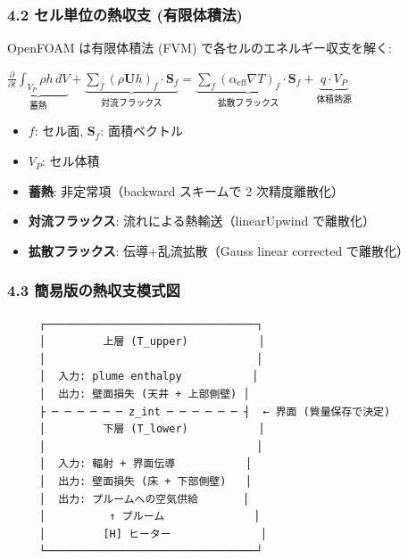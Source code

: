 \documentclass[a4paper,11pt]{article}
\begin{document}
\subsubsection{4.2 セル単位の熱収支 (有限体積法)}

OpenFOAM は有限体積法 (FVM) で各セルのエネルギー収支を解く:

$
\underbrace{\frac{\partial}{\partial t} \int_{V_P} \rho h \, dV}_{\text{蓄熱}}
+ \underbrace{\sum_f (\rho \mathbf{U} h)_f \cdot \mathbf{S}_f}_{\text{対流フラックス}}
= \underbrace{\sum_f (\alpha_{\text{eff}} \nabla T)_f \cdot \mathbf{S}_f}_{\text{拡散フラックス}}
+ \underbrace{q \cdot V_P}_{\text{体積熱源}}
$

\begin{itemize} \item $f$: セル面, $\mathbf{S}_f$: 面積ベクトル \end{itemize}
\begin{itemize} \item $V_P$: セル体積 \end{itemize}
\begin{itemize} \item \textbf{蓄熱}: 非定常項（backward スキームで 2 次精度離散化） \end{itemize}
\begin{itemize} \item \textbf{対流フラックス}: 流れによる熱輸送（linearUpwind で離散化） \end{itemize}
\begin{itemize} \item \textbf{拡散フラックス}: 伝導+乱流拡散（Gauss linear corrected で離散化） \end{itemize}

\subsubsection{4.3 簡易版の熱収支模式図}

\begin{verbatim}
     ┌─────────────────────────────────┐
     │         上層 (T_upper)           │
     │                                 │
     │  入力: plume enthalpy           │
     │  出力: 壁面損失 (天井 + 上部側壁) │
     ├ ─ ─ ─ ─ ─ ─ z_int ─ ─ ─ ─ ─ ─ ┤  ← 界面 (質量保存で決定)
     │         下層 (T_lower)           │
     │                                 │
     │  入力: 輻射 + 界面伝導           │
     │  出力: 壁面損失 (床 + 下部側壁)   │
     │  出力: プルームへの空気供給       │
     │          ↑ プルーム              │
     │         [H] ヒーター              │
     └─────────────────────────────────┘
\end{verbatim}
\end{document}
